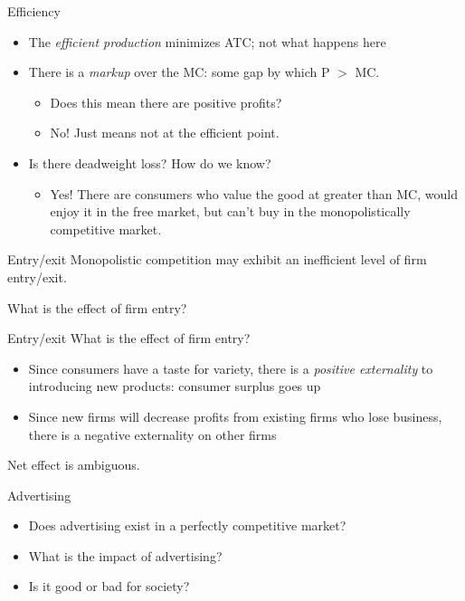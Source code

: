 \documentclass[aspectratio=169]{beamer}
\begin{document}
\begin{frame}{Efficiency}
    \begin{itemize}
        \item The \textit{efficient production} minimizes ATC; not what happens here
        \item There is a \textit{markup} over the MC: some gap by which P $>$ MC.
        \begin{itemize}
            \item Does this mean there are positive profits?
            \item No! Just means not at the efficient point.
        \end{itemize} 
        \item Is there deadweight loss? How do we know?
        \begin{itemize}
            \item Yes! There are consumers who value the good at greater than MC, would enjoy it in the free market, but can't buy in the monopolistically competitive market.
        \end{itemize}
    \end{itemize}
\end{frame}

\begin{frame}{Entry/exit}
    Monopolistic competition may exhibit an inefficient level of firm entry/exit.

    \vspace{5mm}

    What is the effect of firm entry?
\end{frame}

\begin{frame}{Entry/exit}
    What is the effect of firm entry?
    \begin{itemize}
        \item Since consumers have a taste for variety, there is a \textit{positive externality} to introducing new products: consumer surplus goes up
        \item Since new firms will decrease profits from existing firms who lose business, there is a negative externality on other firms
    \end{itemize}

    Net effect is ambiguous.
\end{frame}

\begin{frame}{Advertising}
    \begin{itemize}
        \item Does advertising exist in a perfectly competitive market?
        \item What is the impact of advertising?
        \item Is it good or bad for society?
    \end{itemize}
\end{frame}
\end{document}
